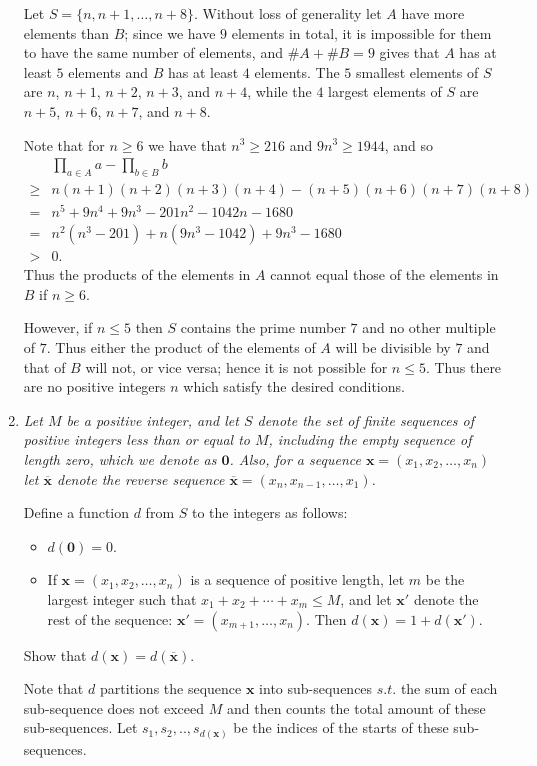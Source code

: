 \documentclass{article}
\begin{document}
\begin{enumerate}
Let $S = \{n, n+1, \dotsc, n+8\}$.
Without loss of generality let $A$ have more elements than $B$; since we have $9$ elements in total, it is impossible for them to have the same number of elements, and $\#A +\#B = 9$ gives that $A$ has at least $5$ elements and $B$ has at least $4$ elements.
The $5$ smallest elements of $S$ are $n$, $n+1$, $n+2$, $n+3$, and $n+4$, while the $4$ largest elements of $S$ are $n+5$, $n+6$, $n+7$, and $n+8$.

Note that for $n \geq 6$ we have that $n^3 \geq 216$ and $9n^3 \geq 1944$, and so
\begin{align*}
	& \prod_{a \in A} a -\prod_{b \in B} b \\
	\geq & n(n+1)(n+2)(n+3)(n+4) - (n+5)(n+6)(n+7)(n+8) \\
	= & n^5 +9n^4 +9n^3 -201n^2 -1042n -1680 \\
	= & n^2(n^3-201) +n(9n^3-1042) +9n^3-1680 \\
	> & 0.
\end{align*}
Thus the products of the elements in $A$ cannot equal those of the elements in $B$ if $n \geq 6$.

However, if $n \leq 5$ then $S$ contains the prime number $7$ and no other multiple of $7$.
Thus either the product of the elements of $A$ will be divisible by $7$ and that of $B$ will not, or vice versa; hence it is not possible for $n \leq 5$.
Thus there are no positive integers $n$ which satisfy the desired conditions.


\medskip
\item %
{\itshape Let $M$ be a positive integer, and let $S$ denote the set of finite sequences of positive integers less than or equal to $M$, including the empty sequence of length zero, which we denote as $\mathbf{0}$.
Also, for a sequence $\mathbf{x} = (x_1, x_2, \dotsc, x_n)$ let $\overline{\mathbf{x}}$ denote the reverse sequence $\overline{\mathbf{x}} = (x_n, x_{n-1}, \dotsc, x_1)$.

Define a function $d$ from $S$ to the integers as follows:
\begin{itemize}
\item $d(\mathbf{0}) = 0$.
\item If $\mathbf{x} = (x_1, x_2, \dotsc, x_n)$ is a sequence of positive length, let $m$ be the largest integer such that $x_1 +x_2 +\dotsb +x_m \leq M$, and let $\mathbf{x}'$ denote the rest of the sequence: $\mathbf{x}' = (x_{m+1}, \dotsc, x_n)$.
Then $d(\mathbf{x}) = 1 +d(\mathbf{x}')$.
\end{itemize}
Show that $d(\mathbf{x}) = d(\overline{\mathbf{x}})$.}
Note that $d$ partitions the sequence $\mathbf{x}$ into sub-sequences $s.t.$ the sum of each sub-sequence does not exceed $M$ and then counts the total amount of these sub-sequences. Let ${s_1, s_2, .., s_{d(\mathbf{x})}}$ be the indices of the  starts of these sub-sequences.


\end{enumerate}
\end{document}
